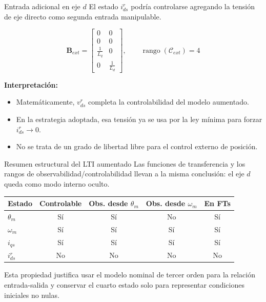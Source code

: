 \documentclass[aspectratio=169,t]{beamer}
\begin{document}
\begin{frame}{Entrada adicional en eje $d$}
{\small\color{uncGray}El estado $i_{ds}^{r}$ podría controlarse agregando la tensión de eje directo como segunda entrada manipulable.}\par
\vspace{2mm}

\begin{equation*}
\bm{B}_{ext}=
\begin{bmatrix}
0 & 0\\
0 & 0\\
\frac{1}{L_q} & 0\\
0 & \frac{1}{L_d}
\end{bmatrix},
\qquad
\operatorname{rango}(\mathcal{C}_{ext})=4
\end{equation*}

\textbf{Interpretación:}
\begin{itemize}
  \item Matemáticamente, $v_{ds}^{r}$ completa la controlabilidad del modelo aumentado.
  \item En la estrategia adoptada, esa tensión ya se usa por la ley mínima para forzar $i_{ds}^{r}\to0$.
  \item No se trata de un grado de libertad libre para el control externo de posición.
\end{itemize}
\end{frame}

\begin{frame}{Resumen estructural del LTI aumentado}
{\small\color{uncGray}Las funciones de transferencia y los rangos de observabilidad/controlabilidad llevan a la misma conclusión: el eje $d$ queda como modo interno oculto.}\par
\vspace{3mm}

\centering
\small
\begin{tabular}{lcccc}
\toprule
\textbf{Estado} & \textbf{Controlable} & \textbf{Obs. desde $\theta_m$} & \textbf{Obs. desde $\omega_m$} & \textbf{En FTs}\\
\midrule
$\theta_m$ & Sí & Sí & No & Sí\\
$\omega_m$ & Sí & Sí & Sí & Sí\\
$i_{qs}$ & Sí & Sí & Sí & Sí\\
$i_{ds}^{r}$ & No & No & No & No\\
\bottomrule
\end{tabular}
\normalsize

\vspace{4mm}
\raggedright
{\small Esta propiedad justifica usar el modelo nominal de tercer orden para la relación entrada-salida y conservar el cuarto estado solo para representar condiciones iniciales no nulas.}
\end{frame}
\end{document}
